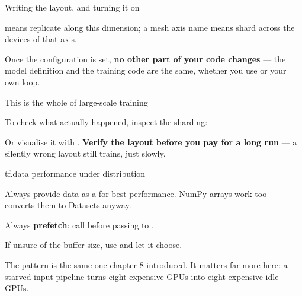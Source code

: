 \documentclass[aspectratio=169,11pt,t]{beamer}
\begin{document}
\begin{frame}[shrink=25]{Writing the layout, and turning it on}
{\fontsize{9.4}{12.6}\selectfont\color{fg2} means replicate along this dimension; a mesh axis name means shard across the devices of that axis.\par}\vskip 4pt
{\fontsize{9.4}{12.6}\selectfont\color{fg2}Once the configuration is set, \textbf{no other part of your code changes} --- the model definition and the training code are the same, whether you use  or your own loop.\par}\vskip 4pt
\end{frame}

\begin{frame}[shrink=25]{This is the whole of large-scale training}
{\fontsize{9.4}{12.6}\selectfont\color{fg2}To check what actually happened, inspect the sharding:\par}\vskip 4pt
{\fontsize{9.4}{12.6}\selectfont\color{fg2}Or visualise it with . \textbf{Verify the layout before you pay for a long run} --- a silently wrong layout still trains, just slowly.\par}\vskip 4pt
\end{frame}

\begin{frame}[shrink=25]{tf.data performance under distribution}
\begin{ibullets}
\item Always provide data as a \textbf{} for best performance. NumPy arrays work too ---  converts them to Datasets anyway.
\item Always \textbf{prefetch}: call  before passing to .
\item If unsure of the buffer size, use \textbf{} and let it choose.
\end{ibullets}
{\fontsize{9.4}{12.6}\selectfont\color{fg2}The pattern is the same one chapter 8 introduced. It matters far more here: a starved input pipeline turns eight expensive GPUs into eight expensive idle GPUs.\par}\vskip 4pt
\end{frame}
\end{document}
